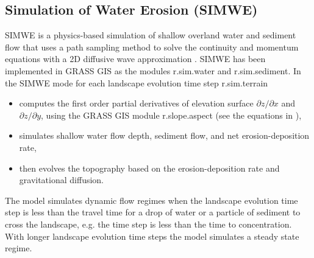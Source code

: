 \documentclass[gmd, manuscript]{copernicus}
\begin{document}
\subsection{Simulation of Water Erosion (SIMWE)} \label{simwe}


SIMWE is a physics-based simulation of shallow overland water and sediment flow
that uses a path sampling method to solve the continuity and momentum equations 
with a 2D diffusive wave approximation 
\citep{Mitas1998,Mitasova2004}.
SIMWE has been implemented in GRASS GIS as the modules 
r.sim.water
and r.sim.sediment. 
In the SIMWE mode for each landscape evolution time step
r.sim.terrain
\begin{itemize}
  \item computes the first order partial derivatives of elevation surface
        $\partial z / \partial x$ and $\partial z / \partial y$, 
        using the GRASS GIS module r.slope.aspect (see the equations in \citep{hofierka2009}),
  \item simulates shallow water flow depth, sediment flow, and net erosion-deposition rate, 
  \item then evolves the topography based on the erosion-deposition rate
        and gravitational diffusion. 
\end{itemize}
%
The model simulates dynamic flow regimes
when the landscape evolution time step is less than the travel time 
for a drop of water or a particle of sediment to cross the landscape,
e.g. the time step is less than the time to concentration.
With longer landscape evolution time steps the model simulates a steady state regime. 

% 
\end{document}

